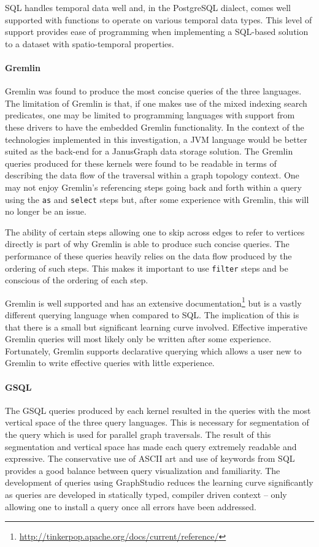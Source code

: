 SQL handles temporal data well and, in the PostgreSQL dialect, comes well supported with functions to operate on various temporal data types. This level of support provides ease of programming when implementing a SQL-based solution to a dataset with spatio-temporal properties.

\paragraph{Gremlin} 

Gremlin was found to produce the most concise queries of the three languages. The limitation of Gremlin is that, if one makes use of the mixed indexing search predicates, one may be limited to programming languages with support from these drivers to have the embedded Gremlin functionality. In the context of the technologies implemented in this investigation, a JVM language would be better suited as the back-end for a JanusGraph data storage solution. The Gremlin queries produced for these kernels were found to be readable in terms of describing the data flow of the traversal within a graph topology context. One may not enjoy Gremlin's referencing steps going back and forth within a query using the \texttt{as} and \texttt{select} steps but, after some experience with Gremlin, this will no longer be an issue.

The ability of certain steps allowing one to skip across edges to refer to vertices directly is part of why Gremlin is able to produce such concise queries. The performance of these queries heavily relies on the data flow produced by the ordering of such steps. This makes it important to use \texttt{filter} steps and be conscious of the ordering of each step.

Gremlin is well supported and has an extensive documentation\footnote{\url{http://tinkerpop.apache.org/docs/current/reference/}} but is a vastly different querying language when compared to SQL. The implication of this is that there is a small but significant learning curve involved. Effective imperative Gremlin queries will most likely only be written after some experience. Fortunately, Gremlin supports declarative querying which allows a user new to Gremlin to write effective queries with little experience.

\paragraph{GSQL} 

The GSQL queries produced by each kernel resulted in the queries with the most vertical space of the three query languages. This is necessary for segmentation of the query which is used for parallel graph traversals. The result of this segmentation and vertical space has made each query extremely readable and expressive. The conservative use of ASCII art and use of keywords from SQL provides a good balance between query visualization and familiarity. The development of queries using GraphStudio reduces the learning curve significantly as queries are developed in statically typed, compiler driven context -- only allowing one to install a query once all errors have been addressed. 

